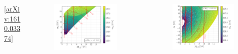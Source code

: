 \documentclass[10pt,aspectratio=169]{beamer}
\begin{document}
\begin{frame}
\begin{columns}[t]
\begin{column}{0.3\textwidth}
      \vspace{-20pt}
      \begin{center}
        \tiny [\href{https://arxiv.org/abs/1610.03374}{arXiv:1610.03374}]
      \end{center}
    \end{column}
    \begin{column}{0.7\textwidth}
      \begin{columns}[t]
        \begin{column}{0.5\textwidth}
          \vspace{-32pt}
          \begin{figure}
            \hspace*{20pt}
            \includegraphics[width=0.93\textwidth]{cmssm_mupos400GeV_m12m0_Mhh}
          \end{figure}
        \end{column}
        \begin{column}{0.5\textwidth}
          \vspace{-20pt}
          \begin{figure}
            \centering
            \includegraphics[width=0.92\textwidth]{cmssm_mupos400GeV_m12A0_Mhh}

\end{figure}
\end{column}
\end{columns}
\end{column}
\end{columns}
\end{frame}
\end{document}
